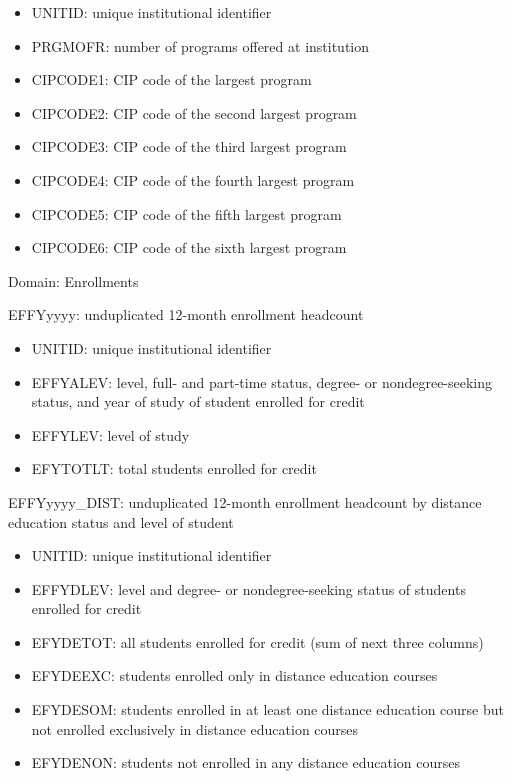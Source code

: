 \documentclass[sigconf, authorversion, nonacm]{acmart}
\begin{document}
        \begin{itemize}
            \item UNITID: unique institutional identifier
            \item PRGMOFR: number of programs offered at institution
            \item CIPCODE1: CIP code of the largest program
            \item CIPCODE2: CIP code of the second largest program
            \item CIPCODE3: CIP code of the third largest program
            \item CIPCODE4: CIP code of the fourth largest program
            \item CIPCODE5: CIP code of the fifth largest program
            \item CIPCODE6: CIP code of the sixth largest program
        \end{itemize}

        Domain: Enrollments

        EFFYyyyy: unduplicated 12-month enrollment headcount

        \begin{itemize}
            \item UNITID: unique institutional identifier
            \item EFFYALEV: level, full- and part-time status, degree- or nondegree-seeking status, and year of study of student enrolled for credit
            \item EFFYLEV: level of study
            \item EFYTOTLT: total students enrolled for credit
        \end{itemize}

        EFFYyyyy\_DIST: unduplicated 12-month enrollment headcount by distance education status and level of student

        \begin{itemize}
            \item UNITID: unique institutional identifier
            \item EFFYDLEV: level and degree- or nondegree-seeking status of students enrolled for credit
            \item EFYDETOT: all students enrolled for credit (sum of next three columns)
            \item EFYDEEXC: students enrolled only in distance education courses
            \item EFYDESOM: students enrolled in at least one distance education course but not enrolled exclusively in distance education courses
            \item EFYDENON: students not enrolled in any distance education courses
        \end{itemize}
\end{document}
